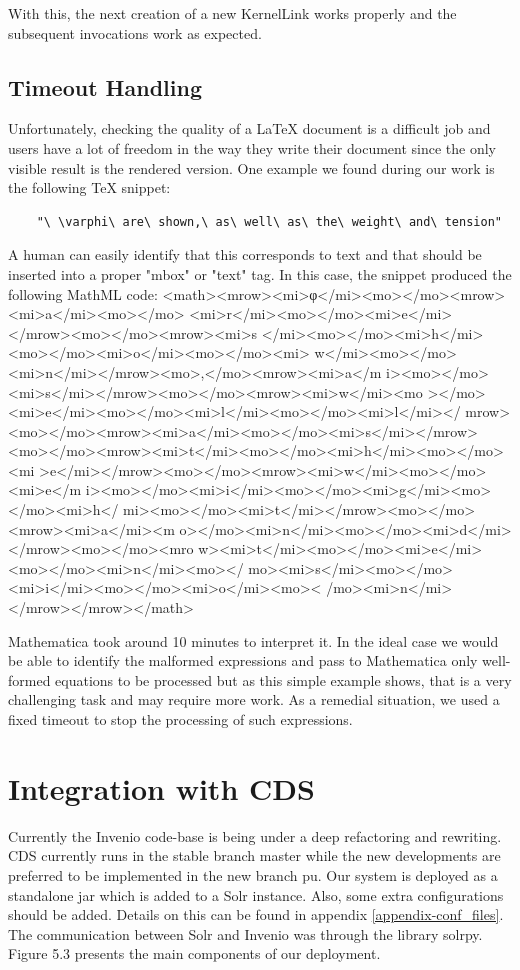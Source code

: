 With this, the next creation of a new KernelLink works properly and the subsequent invocations work as expected.


\subsection{Timeout Handling}
Unfortunately, checking the quality of a LaTeX document is a difficult job and users have a lot of freedom in the way they write their document since the only visible result is the rendered version. 
One example we found during our work is the following TeX snippet:
\begin{verbatim}
	"\ \varphi\ are\ shown,\ as\ well\ as\ the\ weight\ and\ tension"
\end{verbatim}
A human can easily identify that this corresponds to text and that should be inserted into a proper "mbox" or "text" tag. In this case, the snippet produced the following MathML code:
\small{\codefont <math><mrow><mi>φ</mi><mo></mo><mrow><mi>a</mi><mo></mo>
<mi>r</mi><mo></mo><mi>e</mi></mrow><mo></mo><mrow><mi>s
</mi><mo></mo><mi>h</mi><mo></mo><mi>o</mi><mo></mo><mi>
w</mi><mo></mo><mi>n</mi></mrow><mo>,</mo><mrow><mi>a</m
i><mo></mo><mi>s</mi></mrow><mo></mo><mrow><mi>w</mi><mo
></mo><mi>e</mi><mo></mo><mi>l</mi><mo></mo><mi>l</mi></
mrow><mo></mo><mrow><mi>a</mi><mo></mo><mi>s</mi></mrow>
<mo></mo><mrow><mi>t</mi><mo></mo><mi>h</mi><mo></mo><mi
>e</mi></mrow><mo></mo><mrow><mi>w</mi><mo></mo><mi>e</m
i><mo></mo><mi>i</mi><mo></mo><mi>g</mi><mo></mo><mi>h</
mi><mo></mo><mi>t</mi></mrow><mo></mo><mrow><mi>a</mi><m
o></mo><mi>n</mi><mo></mo><mi>d</mi></mrow><mo></mo><mro
w><mi>t</mi><mo></mo><mi>e</mi><mo></mo><mi>n</mi><mo></
mo><mi>s</mi><mo></mo><mi>i</mi><mo></mo><mi>o</mi><mo><
/mo><mi>n</mi></mrow></mrow></math>
}

Mathematica took around 10 minutes to interpret it.
In the ideal case we would be able to identify the malformed expressions and pass to Mathematica only well-formed equations to be processed but as this simple example shows, that is a very challenging task and may require more work.
As a remedial situation, we used a fixed timeout to stop the processing of such expressions.

\section{Integration with CDS}
Currently the Invenio code-base is being under a deep refactoring and rewriting. CDS currently runs in the stable branch {\codefont master} while the new developments are preferred to be implemented in the new branch {\codefont pu}. 
Our system is deployed as a standalone {\codefont jar} which is added to a Solr instance. Also, some extra configurations should be added. Details on this can be found in appendix \ref{appendix-conf_files}.
The communication between Solr and Invenio was through the library {\codefont solrpy}. 
Figure 5.3 presents the main components of our deployment.

